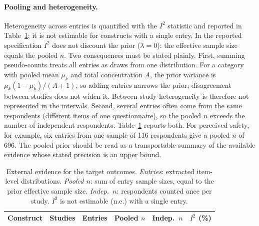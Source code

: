 \paragraph{Pooling and heterogeneity.}
Heterogeneity across entries is quantified with the $I^2$ statistic
\citep{higgins2002} and reported in Table~\ref{tab:i2_summary}; it is not
estimable for constructs with a single entry. In the reported specification
$I^2$ does not discount the prior ($\lambda = 0$): the effective sample size
equals the pooled $n$. Two consequences must be stated plainly. First, summing
pseudo-counts treats all entries as draws from one distribution. For a category
with pooled mean $\mu_k$ and total concentration $A$, the prior variance is
$\mu_k(1-\mu_k)/(A+1)$, so adding entries narrows the prior; disagreement
between studies does not widen it. Between-study heterogeneity is therefore not
represented in the intervals. Second, several entries often come from the same
respondents (different items of one questionnaire), so the pooled $n$ exceeds
the number of independent respondents. Table~\ref{tab:i2_summary} reports both.
For perceived safety, for example, six entries from one sample of 116
respondents give a pooled $n$ of 696. The pooled prior
should be read as a transportable summary of the available evidence whose
stated precision is an upper bound.

\begin{table}[htbp]
\centering
\caption{External evidence for the target outcomes. \emph{Entries}: extracted
item-level distributions. \emph{Pooled $n$}: sum of entry sample sizes, equal
to the prior effective sample size. \emph{Indep.\ $n$}: respondents counted
once per study. $I^2$ is not estimable (n.e.) with a single entry.}
\label{tab:i2_summary}
\small
\begin{tabular}{lrrrrr}
\toprule
\textbf{Construct} & \textbf{Studies} & \textbf{Entries} &
  \textbf{Pooled $n$} & \textbf{Indep.\ $n$} & $I^2$ (\%) \\
\midrule
\bottomrule
\end{tabular}
\end{table}

